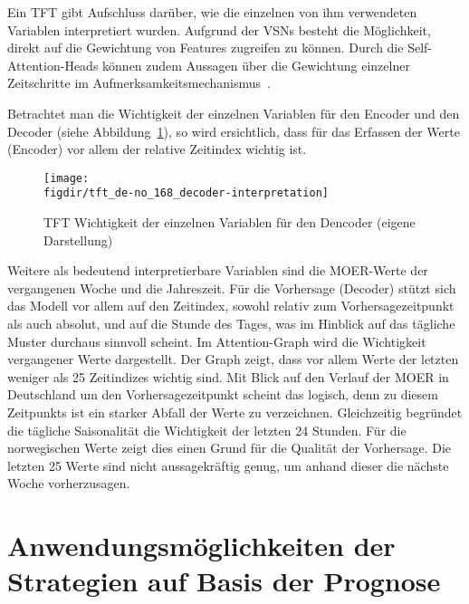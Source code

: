 Ein \ac{TFT} gibt Aufschluss darüber, wie die einzelnen von ihm verwendeten Variablen interpretiert wurden.
Aufgrund der \acp{VSN} besteht die Möglichkeit, direkt auf die Gewichtung von Features zugreifen zu können.
Durch die Self-Attention-Heads können zudem Aussagen über die Gewichtung einzelner Zeitschritte im Aufmerksamkeitsmechanismus~\cite{Joseph.2022}.


Betrachtet man die Wichtigkeit der einzelnen Variablen für den Encoder und den Decoder (siehe Abbildung~\ref{FIG:decoder-interpretation}), so wird ersichtlich, dass für das Erfassen der Werte (Encoder) vor allem der relative Zeitindex wichtig ist.
\begin{figure}
 \caption[TFT Vorhersage Einluss einzelner Variablen]{TFT Wichtigkeit der einzelnen Variablen für den Dencoder (eigene Darstellung)}
 {\texttt{[image: \\figdir/tft\_de-no\_168\_decoder-interpretation]}}
 \label{FIG:decoder-interpretation}
\end{figure}
Weitere als bedeutend interpretierbare Variablen sind die \ac{MOER}-Werte der vergangenen Woche und die Jahreszeit.
Für die Vorhersage (Decoder) stützt sich das Modell vor allem auf den Zeitindex, sowohl relativ zum Vorhersagezeitpunkt als auch absolut, und auf die Stunde des Tages, was im Hinblick auf das tägliche Muster durchaus sinnvoll scheint.
Im Attention-Graph wird die Wichtigkeit vergangener Werte dargestellt.
Der Graph zeigt, dass vor allem Werte der letzten weniger als 25 Zeitindizes wichtig sind.
Mit Blick auf den Verlauf der \ac{MOER} in Deutschland um den Vorhersagezeitpunkt scheint das logisch, denn zu diesem Zeitpunkts ist ein starker Abfall der Werte zu verzeichnen.
Gleichzeitig begründet die tägliche Saisonalität die Wichtigkeit der letzten 24 Stunden.
Für die norwegischen Werte zeigt dies einen Grund für die Qualität der Vorhersage.
Die letzten 25 Werte sind nicht aussagekräftig genug, um anhand dieser die nächste Woche vorherzusagen.
\chapter{Anwendungsmöglichkeiten der Strategien auf Basis der Prognose}\label{CAP:prediction-application}
